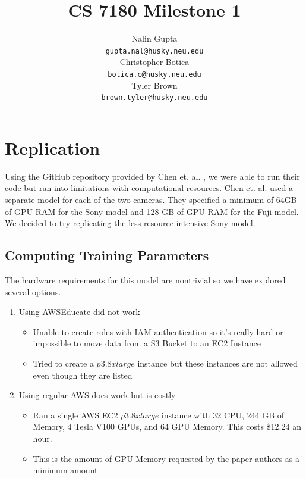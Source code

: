 \documentclass{article}
\title{CS 7180 Milestone 1}
\author{%
  Nalin Gupta \\
  \texttt{gupta.nal@husky.neu.edu} \\
  \And
  Christopher Botica\\
  \texttt{botica.c@husky.neu.edu} \\
  \And
  Tyler Brown\\
  \texttt{brown.tyler@husky.neu.edu} \\
}
\begin{document}

\maketitle

\section{Replication}

Using the GitHub repository provided by Chen et. al. \cite{chen2018learning},
we were able to run their code but ran into limitations with computational
resources. Chen et. al. \cite{chen2018learning} used a separate model for
each of the two cameras. They specified a minimum of 64GB of GPU RAM for the
Sony model and 128 GB of GPU RAM for the Fuji model. We decided to try
replicating the less resource intensive Sony model.

\subsection{Computing Training Parameters}

The hardware requirements for this model are nontrivial so we have explored
several options.

\begin{enumerate}
\item Using AWSEducate did not work
  \begin{itemize}
    \item Unable to create roles with IAM authentication so it's really
	 hard or impossible to move data from a S3 Bucket to an EC2 Instance
    \item Tried to create a $p3.8xlarge$ instance but these instances are
      not allowed even though they are listed
  \end{itemize}
\item Using regular AWS does work but is costly
  \begin{itemize}
    \item Ran a single AWS EC2 $p3.8xlarge$ instance with 32 CPU, 244 GB of
	 Memory, 4 Tesla V100 GPUs, and 64 GPU Memory. This costs \$12.24
	 an hour.
    \item This is the amount of GPU Memory requested by the paper
      authors as a minimum amount
    \end{itemize}
\end{enumerate}
\end{document}
